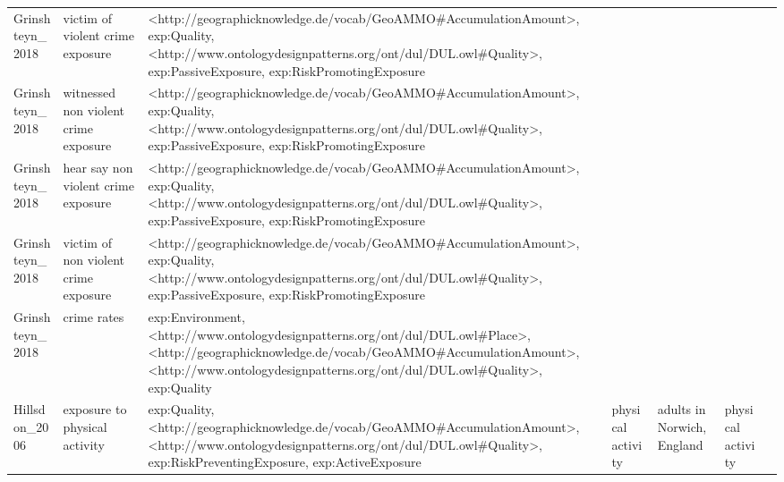 \begin{tabular}{p{1cm}p{1cm}p{1cm}p{1cm}p{1cm}p{1cm}p{1cm}}
Grinshteyn\_2018 & victim of violent crime exposure & <http://geographicknowledge.de/vocab/GeoAMMO\#AccumulationAmount>, exp:Quality, <http://www.ontologydesignpatterns.org/ont/dul/DUL.owl\#Quality>, exp:PassiveExposure, exp:RiskPromotingExposure &  &  &  &  \\
Grinshteyn\_2018 & witnessed non violent crime exposure & <http://geographicknowledge.de/vocab/GeoAMMO\#AccumulationAmount>, exp:Quality, <http://www.ontologydesignpatterns.org/ont/dul/DUL.owl\#Quality>, exp:PassiveExposure, exp:RiskPromotingExposure &  &  &  &  \\
Grinshteyn\_2018 & hear say non violent crime exposure & <http://geographicknowledge.de/vocab/GeoAMMO\#AccumulationAmount>, exp:Quality, <http://www.ontologydesignpatterns.org/ont/dul/DUL.owl\#Quality>, exp:PassiveExposure, exp:RiskPromotingExposure &  &  &  &  \\
Grinshteyn\_2018 & victim of non violent crime exposure & <http://geographicknowledge.de/vocab/GeoAMMO\#AccumulationAmount>, exp:Quality, <http://www.ontologydesignpatterns.org/ont/dul/DUL.owl\#Quality>, exp:PassiveExposure, exp:RiskPromotingExposure &  &  &  &  \\
Grinshteyn\_2018 & crime rates & exp:Environment, <http://www.ontologydesignpatterns.org/ont/dul/DUL.owl\#Place>, <http://geographicknowledge.de/vocab/GeoAMMO\#AccumulationAmount>, <http://www.ontologydesignpatterns.org/ont/dul/DUL.owl\#Quality>, exp:Quality &  &  &  &  \\
Hillsdon\_2006 & exposure to physical activity & exp:Quality, <http://geographicknowledge.de/vocab/GeoAMMO\#AccumulationAmount>, <http://www.ontologydesignpatterns.org/ont/dul/DUL.owl\#Quality>, exp:RiskPreventingExposure, exp:ActiveExposure & physical activity & adults in Norwich, England & physical activity &  \\
\bottomrule
\end{tabular}
